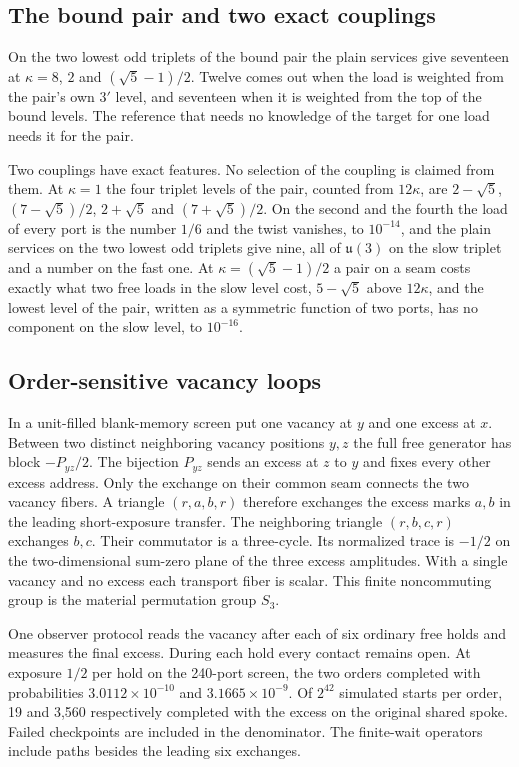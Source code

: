 \documentclass[11pt]{article}
\theoremstyle{definition}
\theoremstyle{remark}
\theoremstyle{plain}
\begin{document}
\subsection{The bound pair and two exact couplings}

On the two lowest odd triplets of the bound pair the plain services give
seventeen at $\kappa=8$, $2$ and $(\sqrt5-1)/2$. Twelve comes out when the
load is weighted from the pair's own $3'$ level, and seventeen when it is
weighted from the top of the bound levels. The reference that needs no
knowledge of the target for one load needs it for the pair.

Two couplings have exact features. No selection of the coupling is claimed
from them. At $\kappa=1$ the four triplet levels of the pair, counted from
$12\kappa$, are $2-\sqrt5$, $(7-\sqrt5)/2$, $2+\sqrt5$ and $(7+\sqrt5)/2$.
On the second and the fourth the load of every port is the number $1/6$ and
the twist vanishes, to $10^{-14}$, and the plain services on the two lowest
odd triplets give nine, all of $\mathfrak u(3)$ on the slow triplet and a
number on the fast one. At $\kappa=(\sqrt5-1)/2$ a pair on a seam costs
exactly what two free loads in the slow level cost, $5-\sqrt5$ above
$12\kappa$, and the lowest level of the pair, written as a symmetric
function of two ports, has no component on the slow level, to $10^{-16}$.


\subsection{Order-sensitive vacancy loops}

In a unit-filled blank-memory screen put one vacancy at $y$ and one excess
at $x$. Between two distinct neighboring vacancy positions $y,z$ the full
free generator has block $-P_{yz}/2$. The bijection $P_{yz}$ sends an
excess at $z$ to $y$ and fixes every other excess address. Only the exchange
on their common seam connects the two vacancy fibers. A triangle
$(r,a,b,r)$ therefore exchanges the excess marks $a,b$ in the leading
short-exposure transfer. The neighboring triangle $(r,b,c,r)$ exchanges
$b,c$. Their commutator is a three-cycle. Its normalized trace is $-1/2$
on the two-dimensional sum-zero plane of the three excess amplitudes.
With a single vacancy and no excess each transport fiber is scalar. This
finite noncommuting group is the material permutation group $S_3$.

One observer protocol reads the vacancy after each of six ordinary free
holds and measures the final excess. During each hold every contact remains
open. At exposure $1/2$ per hold on the 240-port screen, the two orders
completed with probabilities $3.0112\times10^{-10}$ and
$3.1665\times10^{-9}$. Of $2^{42}$ simulated starts per order, 19 and
3,560 respectively completed with the excess on the original shared spoke.
Failed checkpoints are included in the denominator. The finite-wait
operators include paths besides the leading six exchanges.
\end{document}
